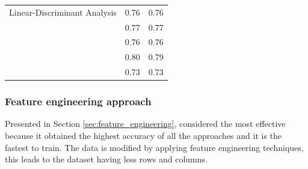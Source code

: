 \begin{table}[htbp]
\begin{tabular}{|c|c|c|}
                        Linear-Discriminant Analysis    & 0.76 & 0.76 \\ 
                                                        & 0.77 & 0.77 \\ 
                                                        & 0.76 & 0.76 \\
                                                        & 0.80 & 0.79 \\ 
                                                        & 0.73 & 0.73 \\ 
                                                        \hline
                    \end{tabular}
                \end{table} 

           \newpage 

            \subsubsection{Feature engineering approach}
                
                Presented in Section \ref{sec:feature_engineering}, considered the most effective because it obtained the highest accuracy of all the approaches and it is the fastest to train. The data is modified by applying feature engineering techniques, this leads to the dataset having less rows and columns.
            
